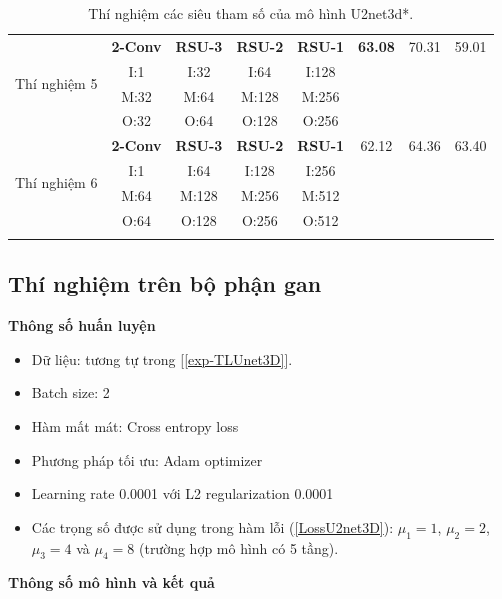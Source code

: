 \begin{table}[H]
\begin{tabular}{c|c c c c|c c c}
        \hline
        \multirow{4}{*}{Thí nghiệm 5} & \textbf{2-Conv} & \textbf{RSU-3} & \textbf{RSU-2} & \textbf{RSU-1} & \textbf{63.08} & 70.31 & 59.01 \\
                                      & I:1  & I:32 & I:64 & I:128 \\ 
                                      & M:32 & M:64 & M:128 & M:256 \\
                                      & O:32 & O:64 & O:128 & O:256 \\
        \hline
        \multirow{4}{*}{Thí nghiệm 6} & \textbf{2-Conv} & \textbf{RSU-3} & \textbf{RSU-2} & \textbf{RSU-1} & 62.12 & 64.36 & 63.40 \\
                                      & I:1  & I:64  & I:128 & I:256 \\ 
                                      & M:64 & M:128 & M:256 & M:512 \\
                                      & O:64 & O:128 & O:256 & O:512 \\
    \Xhline{3\arrayrulewidth}
    \end{tabular}
    \caption{Thí nghiệm các siêu tham số của mô hình U2net3d*.}
    \label{tab:hyperparameter_vessel}
\end{table}

\subsection{Thí nghiệm trên bộ phận gan}
\noindent \textbf{Thông số huấn luyện}\\
\vspace{-7mm}
\begin{itemize}[itemsep=0pt, topsep=0pt]
    \item Dữ liệu: tương tự trong [\ref{exp-TLUnet3D}].
    \item Batch size: 2
    \item Hàm mất mát: Cross entropy loss
    \item Phương pháp tối ưu: Adam optimizer
    \item Learning rate 0.0001 với L2 regularization 0.0001
    \item Các trọng số được sử dụng trong hàm lỗi (\ref{LossU2net3D}): $\mu_{1} = 1$,  $\mu_{2} = 2$,  $\mu_{3} = 4$ và $\mu_{4} = 8$ (trường hợp mô hình có 5 tầng).
\end{itemize}

\noindent \textbf{Thông số mô hình và kết quả}

